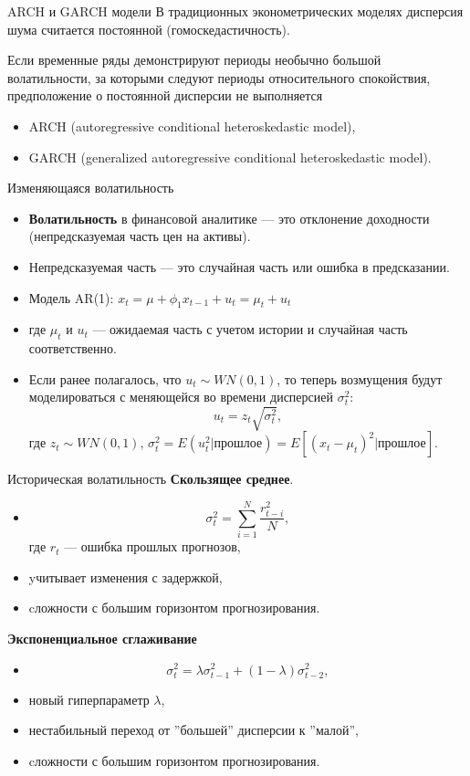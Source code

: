 \begin{frame}{ARCH и GARCH модели}
В традиционных эконометрических моделях дисперсия шума считается постоянной (гомоскедастичность).

Если временные ряды демонстрируют периоды необычно большой волатильности, за которыми следуют периоды относительного спокойствия, предположение о постоянной дисперсии  не выполняется
\begin{itemize}
    \item ARCH (autoregressive conditional heteroskedastic model),
    \item GARCH (generalized autoregressive conditional heteroskedastic
model).
\end{itemize}
\end{frame}
\begin{frame}{Изменяющаяся волатильность}
\begin{itemize}
\item \textbf{Волатильность} в финансовой аналитике --- это отклонение доходности (непредсказуемая часть цен на активы).
\item Непредсказуемая часть --- это случайная часть или ошибка в предсказании.
\item Модель AR(1): $x_t = \mu + \phi_1 x_{t-1} + u_t = \mu_t + u_t$
\item где $\mu_t$ и $u_t$ — ожидаемая часть с учетом истории и случайная часть соответственно.

\item Если ранее полагалось, что $u_t \sim WN(0,1)$, то теперь возмущения будут моделироваться с меняющейся во времени дисперсией $\sigma_t^2$: $$u_t =  z_t \sqrt{\sigma_t^2},$$ где $z_t \sim WN(0,1)$, $\sigma_t^2 = E(u_t^2|\text{прошлое})=E[(x_t - \mu_t)^2|\text{прошлое}]$.

\end{itemize}
\end{frame}
\begin{frame}{Историческая волатильность}
\textbf{Скользящее среднее}.
\begin{itemize}
    \item $$ \sigma_t^2 = \sum_{i=1}^{N}\frac{r_{t-i}^2}{N},$$
     где $r_t$ --- ошибка прошлых прогнозов,
    \item yчитывает изменения с задержкой,
    \item cложности с большим горизонтом прогнозирования.
\end{itemize}
\textbf{Экспоненциальное сглаживание}
\begin{itemize}
    \item $$ \sigma_t^2 = \lambda\sigma_{t-1}^2 + (1-\lambda)\sigma_{t-2}^2,$$
\item новый гиперпараметр $\lambda$,
\item нестабильный переход от ''большей'' дисперсии к ''малой'',
\item cложности с большим горизонтом прогнозирования.
\end{itemize}
\end{frame}
